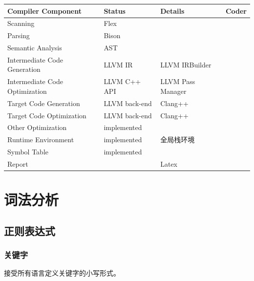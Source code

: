 \documentclass{article}
\begin{document}
\begin{table}[H]
    \begin{tabular}{|l|l|l|l|}
        \hline
        \textbf{Compiler Component}    & \textbf{Status} & \textbf{Details}   & \textbf{Coder}  \\ \hline
        Scanning                       & Flex            &                    &           \\ \hline
        Parsing                        & Bison           &                    &           \\ \hline
        Semantic Analysis              & AST             &                    &           \\ \hline
        Intermediate Code Generation   & LLVM IR         & LLVM IRBuilder     &           \\ \hline
        Intermediate Code Optimization & LLVM C++ API    & LLVM Pass Manager  &           \\ \hline
        Target Code Generation         & LLVM back-end   & Clang++            &           \\ \hline
        Target Code Optimization       & LLVM back-end   & Clang++            &           \\ \hline
        Other Optimization             & implemented     &                    &           \\ \hline
        Runtime Environment            & implemented     & 全局栈环境          &          \\ \hline
        Symbol Table                   & implemented     &                    &           \\ \hline
        Report                         &                 & Latex              &           \\ \hline
    \end{tabular}
\end{table}

\newpage
\section{词法分析}
\subsection{正则表达式}
\subsubsection{关键字}
\par 接受所有语言定义关键字的小写形式。
\end{document}
